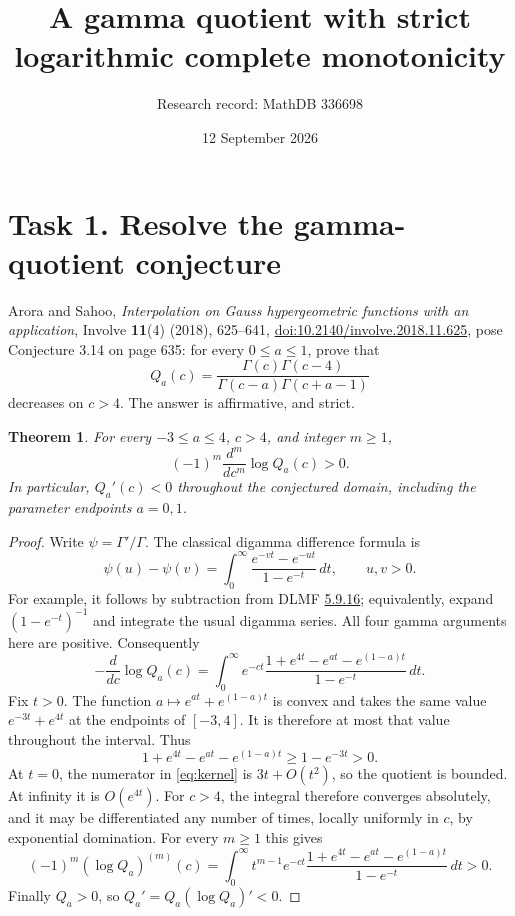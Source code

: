 \documentclass[11pt]{article}
\title{A gamma quotient with strict logarithmic complete monotonicity}
\author{Research record: MathDB 336698}
\date{12 September 2026}
\newtheorem{theorem}{Theorem}
\newcommand{\dd}{\,dt}
\begin{document}
\maketitle

\section*{Task 1. Resolve the gamma-quotient conjecture}
Arora and Sahoo, \emph{Interpolation on Gauss hypergeometric functions
with an application}, Involve \textbf{11}(4) (2018), 625--641,
\href{https://doi.org/10.2140/involve.2018.11.625}{doi:10.2140/involve.2018.11.625},
pose Conjecture 3.14 on page 635: for every $0\le a\le1$, prove that
\[
 Q_a(c)=\frac{\Gamma(c)\Gamma(c-4)}
 {\Gamma(c-a)\Gamma(c+a-1)}
\]
decreases on $c>4$. The answer is affirmative, and strict.

\begin{theorem}\label{thm:main}
For every $-3\le a\le4$, $c>4$, and integer $m\ge1$,
\[
 (-1)^m\frac{d^m}{dc^m}\log Q_a(c)>0.
\]
In particular, $Q_a'(c)<0$ throughout the conjectured domain, including
the parameter endpoints $a=0,1$.
\end{theorem}

\begin{proof}
Write $\psi=\Gamma'/\Gamma$. The classical digamma difference formula is
\[
 \psi(u)-\psi(v)
 =\int_0^\infty
 \frac{e^{-vt}-e^{-ut}}{1-e^{-t}}\dd,\qquad u,v>0.
\]
For example, it follows by subtraction from DLMF
\href{https://dlmf.nist.gov/5.9.E16}{5.9.16}; equivalently,
expand $(1-e^{-t})^{-1}$ and integrate the usual digamma series.
All four gamma arguments here are positive. Consequently
\begin{equation}\label{eq:kernel}
 -\frac{d}{dc}\log Q_a(c)
 =\int_0^\infty e^{-ct}
 \frac{1+e^{4t}-e^{at}-e^{(1-a)t}}{1-e^{-t}}\dd.
\end{equation}
Fix $t>0$. The function
$a\mapsto e^{at}+e^{(1-a)t}$ is convex and takes the same value
$e^{-3t}+e^{4t}$ at the endpoints of $[-3,4]$. It is therefore at most
that value throughout the interval. Thus
\[
 1+e^{4t}-e^{at}-e^{(1-a)t}
 \ge 1-e^{-3t}>0.
\]
At $t=0$, the numerator in \eqref{eq:kernel} is $3t+O(t^2)$,
so the quotient is bounded. At infinity it is $O(e^{4t})$.
For $c>4$, the integral therefore converges absolutely, and it may be
differentiated any number of times, locally uniformly in $c$, by
exponential domination. For every $m\ge1$ this gives
\[
 (-1)^m(\log Q_a)^{(m)}(c)
 =\int_0^\infty t^{m-1}e^{-ct}
 \frac{1+e^{4t}-e^{at}-e^{(1-a)t}}{1-e^{-t}}\dd>0.
\]
Finally $Q_a>0$, so $Q_a'=Q_a(\log Q_a)'<0$.
\end{proof}
\end{document}
